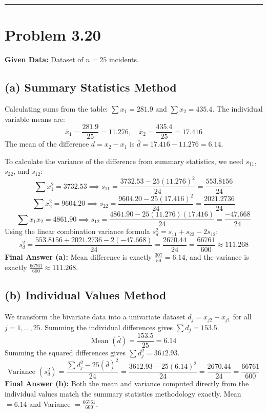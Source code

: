 \documentclass{article}
\begin{document}
\rule{\textwidth}{0.4pt}

\section*{Problem 3.20}
\textbf{Given Data:} Dataset of $n=25$ incidents.

\subsection*{(a) Summary Statistics Method}
Calculating sums from the table: $\sum x_1 = 281.9$ and $\sum x_2 = 435.4$. 
The individual variable means are:
$$ \bar{x}_1 = \frac{281.9}{25} = 11.276, \quad \bar{x}_2 = \frac{435.4}{25} = 17.416 $$
The mean of the difference $d = x_2 - x_1$ is $\bar{d} = 17.416 - 11.276 = 6.14$.

To calculate the variance of the difference from summary statistics, we need $s_{11}$, $s_{22}$, and $s_{12}$:
$$ \sum x_1^2 = 3732.53 \implies s_{11} = \frac{3732.53 - 25(11.276)^2}{24} = \frac{553.8156}{24} $$
$$ \sum x_2^2 = 9604.20 \implies s_{22} = \frac{9604.20 - 25(17.416)^2}{24} = \frac{2021.2736}{24} $$
$$ \sum x_1 x_2 = 4861.90 \implies s_{12} = \frac{4861.90 - 25(11.276)(17.416)}{24} = \frac{-47.668}{24} $$
Using the linear combination variance formula $s_d^2 = s_{11} + s_{22} - 2s_{12}$:
$$ s_d^2 = \frac{553.8156 + 2021.2736 - 2(-47.668)}{24} = \frac{2670.44}{24} = \frac{66761}{600} \approx 111.268 $$
\textbf{Final Answer (a):} Mean difference is exactly $\frac{307}{50} = 6.14$, and the variance is exactly $\frac{66761}{600} \approx 111.268$.

\subsection*{(b) Individual Values Method}
We transform the bivariate data into a univariate dataset $d_j = x_{j2} - x_{j1}$ for all $j=1, \dots, 25$. 
Summing the individual differences gives $\sum d_j = 153.5$. 
$$ \text{Mean } (\bar{d}) = \frac{153.5}{25} = 6.14 $$
Summing the squared differences gives $\sum d_j^2 = 3612.93$. 
$$ \text{Variance } (s_d^2) = \frac{\sum d_j^2 - 25(\bar{d})^2}{24} = \frac{3612.93 - 25(6.14)^2}{24} = \frac{2670.44}{24} = \frac{66761}{600} $$
\textbf{Final Answer (b):} Both the mean and variance computed directly from the individual values match the summary statistics methodology exactly. Mean $= 6.14$ and Variance $= \frac{66761}{600}$.
\end{document}
